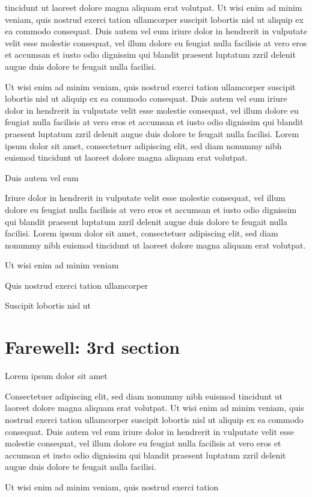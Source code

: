 \documentclass[11pt,twoside]{article}\makeatletter
\makeatletter
\renewcommand\section{\@startsection {section}{1}{\z@}%
     {-1.75ex \@plus -0.5ex \@minus -.2ex}%
     {0.5ex \@plus .2ex}%
     {\reset@font\Large\bfseries\sffamily}}
\def\DivI{\section}
\def\DivI{\chapter}
\makeatother
\begin{document}
      tincidunt ut laoreet dolore magna aliquam erat volutpat. Ut wisi enim
      ad minim veniam, quis nostrud exerci tation ullamcorper suscipit
      lobortis nisl ut aliquip ex ea commodo consequat. Duis autem vel eum
      iriure dolor in hendrerit in vulputate velit esse molestie consequat,
      vel illum dolore eu feugiat nulla facilisis at vero eros et accumsan
      et iusto odio dignissim qui blandit praesent luptatum zzril delenit
      augue duis dolore te feugait nulla facilisi.\par Ut wisi enim ad minim veniam, quis nostrud exerci tation
      ullamcorper suscipit lobortis nisl ut aliquip ex ea commodo
      consequat. Duis autem vel eum iriure dolor in hendrerit in vulputate
      velit esse molestie consequat, vel illum dolore eu feugiat nulla
      facilisis at vero eros et accumsan et iusto odio dignissim qui blandit
      praesent luptatum zzril delenit augue duis dolore te feugait nulla
      facilisi. Lorem ipsum dolor sit amet, consectetuer adipiscing elit,
      sed diam nonummy nibh euismod tincidunt ut laoreet dolore magna
      aliquam erat volutpat. \par Duis autem vel eum \par Iriure dolor in hendrerit in vulputate velit esse molestie
      consequat, vel illum dolore eu feugiat nulla facilisis at vero eros et
      accumsan et iusto odio dignissim qui blandit praesent luptatum zzril
      delenit augue duis dolore te feugait nulla facilisi. Lorem ipsum dolor
      sit amet, consectetuer adipiscing elit, sed diam nonummy nibh euismod
      tincidunt ut laoreet dolore magna aliquam erat volutpat. \par Ut wisi enim ad minim veniam\par Quis nostrud exerci tation ullamcorper \par Suscipit lobortis nisl ut 
\DivI[Farewell: 3rd section]{Farewell: 3rd section}\label{part3}\par Lorem ipsum dolor sit amet\par Consectetuer adipiscing elit, sed diam nonummy nibh euismod
      tincidunt ut laoreet dolore magna aliquam erat volutpat. Ut wisi enim
      ad minim veniam, quis nostrud exerci tation ullamcorper suscipit
      lobortis nisl ut aliquip ex ea commodo consequat. Duis autem vel eum
      iriure dolor in hendrerit in vulputate velit esse molestie consequat,
      vel illum dolore eu feugiat nulla facilisis at vero eros et accumsan
      et iusto odio dignissim qui blandit praesent luptatum zzril delenit
      augue duis dolore te feugait nulla facilisi.\par Ut wisi enim ad minim veniam, quis nostrud exerci tation
\end{document}
